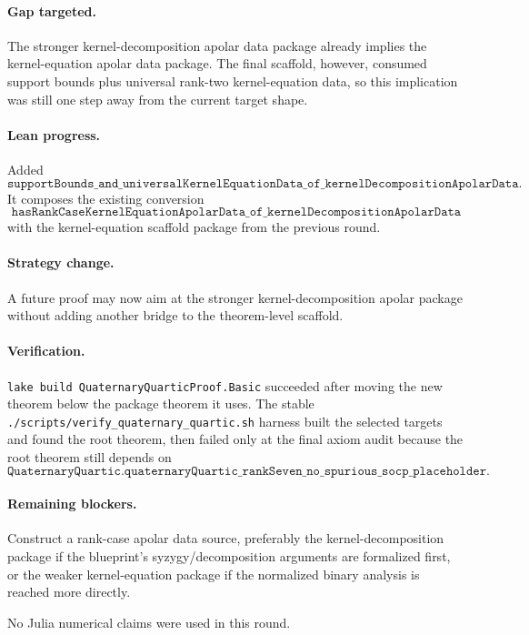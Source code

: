 \documentclass[11pt]{article}
\begin{document}
\paragraph{Gap targeted.}
The stronger kernel-decomposition apolar data package already implies the
kernel-equation apolar data package.  The final scaffold, however, consumed
support bounds plus universal rank-two kernel-equation data, so this implication
was still one step away from the current target shape.

\paragraph{Lean progress.}
Added
\[
\texttt{supportBounds\_and\_universalKernelEquationData\_of\_kernelDecompositionApolarData}.
\]
It composes the existing conversion
\[
\texttt{hasRankCaseKernelEquationApolarData\_of\_kernelDecompositionApolarData}
\]
with the kernel-equation scaffold package from the previous round.

\paragraph{Strategy change.}
A future proof may now aim at the stronger kernel-decomposition apolar package
without adding another bridge to the theorem-level scaffold.

\paragraph{Verification.}
\texttt{lake build QuaternaryQuarticProof.Basic} succeeded after moving the new
theorem below the package theorem it uses.  The stable
\texttt{./scripts/verify\_quaternary\_quartic.sh} harness built the selected
targets and found the root theorem, then failed only at the final axiom audit
because the root theorem still depends on
\[
\texttt{QuaternaryQuartic.quaternaryQuartic\_rankSeven\_no\_spurious\_socp\_placeholder}.
\]

\paragraph{Remaining blockers.}
Construct a rank-case apolar data source, preferably the kernel-decomposition
package if the blueprint's syzygy/decomposition arguments are formalized first,
or the weaker kernel-equation package if the normalized binary analysis is
reached more directly.

No Julia numerical claims were used in this round.
\end{document}
